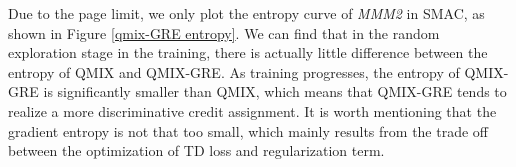Due to the page limit, we only plot the entropy curve of \emph{MMM2} in SMAC, as shown in Figure \ref{qmix-GRE entropy}.
We can find that in the random exploration stage in the training, there is actually little difference between the entropy of QMIX and QMIX-GRE.
As training progresses, the entropy of QMIX-GRE is significantly smaller than QMIX, which means that QMIX-GRE tends to realize a more discriminative credit assignment.
It is worth mentioning that the gradient entropy is not that too small, which mainly results from the trade off between the optimization of TD loss and regularization term.
